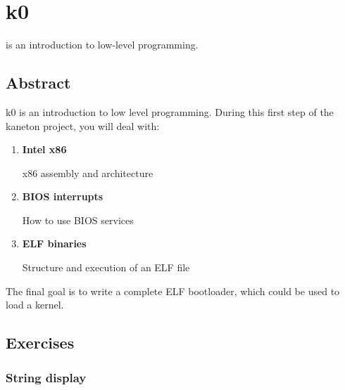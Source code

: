 %
%
%
%
%
%

%
%

\chapter{k0}
\label{chapter:k0}

 is an introduction to low-level programming.

\newpage

%
%

\section{Abstract}

k0 is an introduction to low level programming. During this first step of
the kaneton project, you will deal with:

\begin{enumerate}
  \item
    {\bf Intel x86}

    x86 assembly and architecture
  \item
    {\bf BIOS interrupts}

    How to use BIOS services
  \item
    {\bf ELF binaries}

    Structure and execution of an ELF file
\end{enumerate}

The final goal is to write a complete ELF bootloader, which could be used to
load a kernel.

\clearpage

%
%

\newpage

\section{Exercises}

\subsection{String display}

